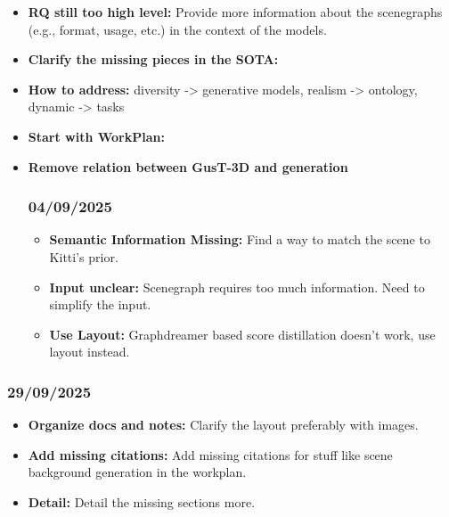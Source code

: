 \documentclass{article}
\begin{document}
\begin{itemize}
    \item \textbf{RQ still too high level:} Provide more information about the scenegraphs (e.g., format, usage, etc.) in the context of the models.
    
    \item \textbf{Clarify the missing pieces in the SOTA:} 

    \item \textbf{How to address:} diversity -> generative models, realism -> ontology, dynamic -> tasks
    
    \item \textbf{Start with WorkPlan:}     
    
    \item \textbf{Remove relation between GusT-3D and generation}
    
\subsubsection{04/09/2025}    

\begin{itemize}
    \item \textbf{Semantic Information Missing:} Find a way to match the scene to Kitti's prior.
    
    \item \textbf{Input unclear:} Scenegraph requires too much information. Need to simplify the input.

    \item \textbf{Use Layout:} Graphdreamer based score distillation doesn't work, use layout instead.
\end{itemize}
\end{itemize}

\subsubsection{29/09/2025}    

\begin{itemize}
    \item \textbf{Organize docs and notes:} Clarify the layout preferably with images.
    
    \item \textbf{Add missing citations:} Add missing citations for stuff like scene background generation in the workplan.

    \item \textbf{Detail:} Detail the missing sections more.
\end{itemize}
\end{document}
